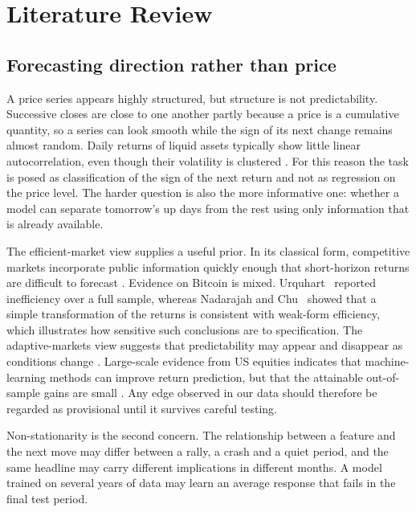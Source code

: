 \section{Literature Review}
\label{ch:lit}
\subsection{Forecasting direction rather than price}
A price series appears highly structured, but structure is not predictability. Successive closes are close to one another partly because a price is a cumulative quantity, so a series can look smooth while the sign of its next change remains almost random. Daily returns of liquid assets typically show little linear autocorrelation, even though their volatility is clustered \cite{cont2001}. For this reason the task is posed as classification of the sign of the next return and not as regression on the price level. The harder question is also the more informative one: whether a model can separate tomorrow's up days from the rest using only information that is already available.

The efficient-market view supplies a useful prior. In its classical form, competitive markets incorporate public information quickly enough that short-horizon returns are difficult to forecast \cite{fama1970}. Evidence on Bitcoin is mixed. Urquhart~\cite{urquhart2016} reported inefficiency over a full sample, whereas Nadarajah and Chu~\cite{nadarajah2017} showed that a simple transformation of the returns is consistent with weak-form efficiency, which illustrates how sensitive such conclusions are to specification. The adaptive-markets view suggests that predictability may appear and disappear as conditions change \cite{lo2004}. Large-scale evidence from US equities indicates that machine-learning methods can improve return prediction, but that the attainable out-of-sample gains are small \cite{gu2020}. Any edge observed in our data should therefore be regarded as provisional until it survives careful testing.

Non-stationarity is the second concern. The relationship between a feature and the next move may differ between a rally, a crash and a quiet period, and the same headline may carry different implications in different months. A model trained on several years of data may learn an average response that fails in the final test period.


